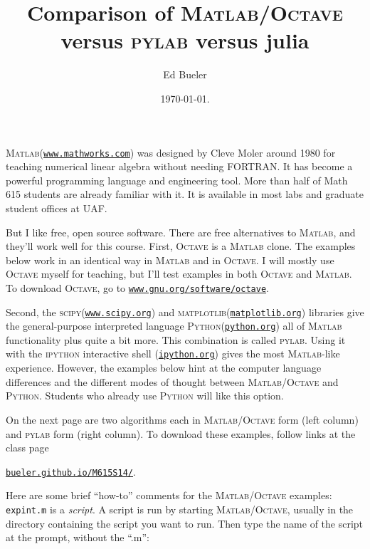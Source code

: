 \documentclass[11pt]{amsart}
\newcommand{\Matlab}{\textsc{Matlab}\xspace}
\newcommand{\Octave}{\textsc{Octave}\xspace}
\newcommand{\python}{\textsc{Python}\xspace}
\newcommand{\pylab}{\textsc{pylab}\xspace}
\newcommand{\scipy}{\textsc{scipy}\xspace}
\newcommand{\matplotlib}{\textsc{matplotlib}\xspace}
\begin{document}
\title{Comparison of \textsc{Matlab/Octave} versus \textsc{pylab} versus {julia}}

\author{Ed Bueler}

\date{\today.}

\maketitle
\normalsize
\thispagestyle{empty}

\newcommand{\hrf}[2]{\href{#1}{\texttt{#2}}}

\Matlab (\hrf{http://www.mathworks.com/}{www.mathworks.com}) was designed by Cleve Moler around 1980 for teaching numerical linear algebra without needing FORTRAN.  It has become a powerful programming language and engineering tool.  More than half of Math 615 students are already familiar with it.  It is available in most labs and graduate student offices at UAF.

But I like free, open source software.  There are free alternatives to \Matlab, and they'll work well for this course.  First, \Octave is a \Matlab clone.  The examples below work in an identical way in \Matlab and in \Octave.  I will mostly use \Octave myself for teaching, but I'll test examples in both \Octave and \Matlab.  To download \Octave, go to 
\hrf{http://www.gnu.org/software/octave/}{www.gnu.org/software/octave}.

Second, the \scipy (\hrf{http://www.scipy.org/}{www.scipy.org}) and \matplotlib (\hrf{http://matplotlib.org/}{matplotlib.org}) libraries give the general-purpose interpreted language \python (\hrf{http://python.org/}{python.org}) all of \Matlab functionality plus quite a bit more.  This combination is called \pylab.  Using it with the \textsc{ipython} interactive shell (\hrf{http://ipython.org/}{ipython.org}) gives the most \Matlab-like experience.  However, the examples below hint at the computer language differences and the different modes of thought between \Matlab/\Octave and \python.  Students who already use \python will like this option.

On the next page are two algorithms each in \Matlab/\Octave form (left column) and \pylab form (right column).  To download these examples, follow links at the class page

\centerline{\hrf{http://bueler.github.io/M615S14/}{bueler.github.io/M615S14/}.}

Here are some brief ``how-to'' comments for the \Matlab/\Octave examples: \texttt{expint.m} is a \emph{script}.  A script is run by starting \Matlab/\Octave, usually in the directory containing the script you want to run.  Then type the name of the script at the prompt, without the ``.m'':
\end{document}
